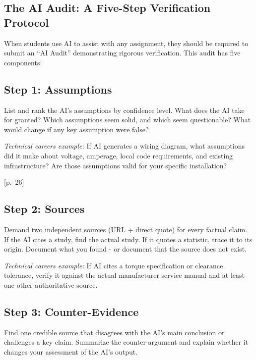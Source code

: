 \documentclass[
  letterpaper,
  DIV=11,
  numbers=noendperiod]{scrreprt}
\begin{document}
\subsection{The AI Audit: A Five-Step Verification
Protocol}\label{the-ai-audit-a-five-step-verification-protocol}

When students use AI to assist with any assignment, they should be
required to submit an ``AI Audit'' demonstrating rigorous verification.
This audit has five components:

\subsection{Step 1: Assumptions}\label{step-1-assumptions}

List and rank the AI's assumptions by confidence level. What does the AI
take for granted? Which assumptions seem solid, and which seem
questionable? What would change if any key assumption were false?

\emph{Technical careers example:} If AI generates a wiring diagram, what
assumptions did it make about voltage, amperage, local code
requirements, and existing infrastructure? Are those assumptions valid
for your specific installation?

{[}p.~26{]}

\subsection{Step 2: Sources}\label{step-2-sources}

Demand two independent sources (URL + direct quote) for every factual
claim. If the AI cites a study, find the actual study. If it quotes a
statistic, trace it to its origin. Document what you found - or document
that the source does not exist.

\emph{Technical careers example:} If AI cites a torque specification or
clearance tolerance, verify it against the actual manufacturer service
manual and at least one other authoritative source.

\subsection{Step 3: Counter-Evidence}\label{step-3-counter-evidence}

Find one credible source that disagrees with the AI's main conclusion or
challenges a key claim. Summarize the counter-argument and explain
whether it changes your assessment of the AI's output.
\end{document}
